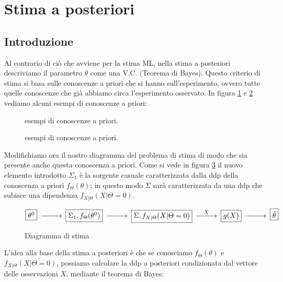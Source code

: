 \section{Stima a posteriori} 
\subsection{Introduzione}
Al contrario di ciò che avviene per la stima ML, nella stima a posteriori descriviamo il parametro $\theta$ come una V.C. (Teorema di Bayes). Questo criterio di stima si basa sulle conoscenze a priori che si hanno sull'esperimento, ovvero tutte quelle conoscenze che già abbiamo circa l'esperimento osservato. In figura \ref{fig:apriori1} e \ref{fig:apriori2} vediamo alcuni esempi di conoscenze a priori:

\begin{figure}[!p]
  \centering
  
        \caption{esempi di conoscenze a priori.\label{fig:apriori1}}
\end{figure}
\begin{figure}[p]
  \centering  
  
  
  \caption{esempi di conoscenze a priori.\label{fig:apriori2}}
\end{figure}

Modifichiamo ora il nostro diagramma del problema di stima di modo che sia presente anche questa conoscenza a priori. Come si vede in figura \ref{fig:diagrammastima2} il nuovo elemento introdotto $\Sigma_1$ è la sorgente casuale caratterizzata dalla ddp della conoscenza a priori $f_\Theta(\theta)$; in questo modo $\Sigma$ sarà caratterizzata da una ddp che subisce una dipendenza $f_{X|\Theta}(X|\Theta=0)$.
\begin{figure}[h]
  \centering
  \[
    \begin{CD}
     \framebox{$\theta^0$} @>>> \framebox{$\Sigma_1, f_\Theta(\theta^0)$} @>>>  \framebox{$\Sigma, f_{X|\Theta}(X|\Theta=0)$} @>X>> \framebox{$g(X)$} @>>> \framebox{$\hat{\theta}$}
    \end{CD}
  \]
  \caption{Diagramma di stima\label{fig:diagrammastima2}}
\end{figure}
L'idea alla base della stima a posteriori è che se conosciamo $f_{\Theta}(\theta)$ e $f_{X|\Theta}(X|\Theta=0)$, possiamo calcolare la ddp a posteriori  condizionata dal vettore delle osservazioni $X$, mediante il teorema di Bayes:

